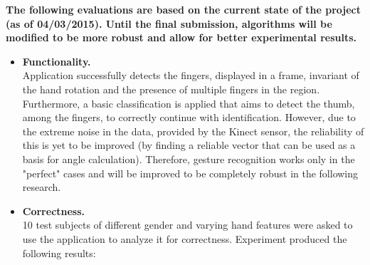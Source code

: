 \documentclass[a4paper,11pt,oneside]{article}
\begin{document}
\textbf{The following evaluations are based on the current state of the project (as of 04/03/2015). Until the final submission, algorithms will be modified to be more robust and allow for better experimental results.}\\

  \begin{itemize}
  \item \textbf{Functionality.} \\
Application successfully detects the fingers, displayed in a frame, invariant of the hand rotation and the presence of multiple fingers in the region. Furthermore, a basic classification is applied that aims to detect the thumb, among the fingers, to correctly continue with identification. However, due to the extreme noise in the data, provided by the Kinect sensor, the reliability of this is yet to be improved (by finding a reliable vector that can be used as a basis for angle calculation). Therefore, gesture recognition works only in the "perfect" cases and will be improved to be completely robust in the following research.

  \item \textbf{Correctness.} \\
10 test subjects of different gender and varying hand features were asked to use the application to analyze it for correctness. Experiment produced the following results:\\


\end{itemize}
\end{document}
